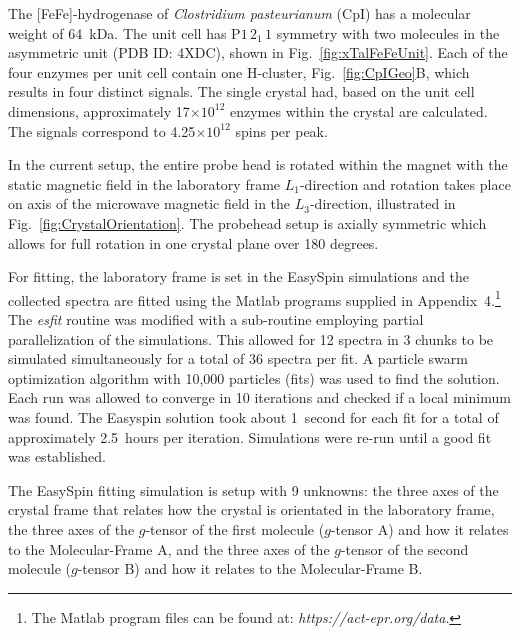 The [FeFe]-hydrogenase of {\em Clostridium pasteurianum} (CpI) has a molecular weight of 64~kDa. The unit cell has P$1\,2_1\,1$ symmetry with two molecules in the asymmetric unit (PDB ID: 4XDC), shown in Fig.~\ref{fig:xTalFeFeUnit}. Each of the four enzymes per unit cell contain one H-cluster, Fig.~\ref{fig:CpIGeo}B, which results in four distinct signals. The single crystal had, based on the unit cell dimensions, approximately 17$\times10^{12}$ enzymes within the crystal are calculated. The signals correspond to 4.25$\times10^{12}$ spins per peak. 

In the current setup, the entire probe head is rotated within the magnet with the static magnetic field in the laboratory frame $L_1$-direction and rotation takes place on axis of the microwave magnetic field in the $L_3$-direction, illustrated in Fig.~\ref{fig:CrystalOrientation}. The probehead setup is axially symmetric which allows for full rotation in one crystal plane over 180 degrees. 

For fitting, the laboratory frame is set in the EasySpin simulations and the collected spectra are fitted using the Matlab programs supplied in Appendix~4.\footnote{The Matlab program files can be found at: \textit{https://act-epr.org/data}.} The \textit{esfit} routine was modified with a sub-routine employing partial parallelization of the simulations. This allowed for 12 spectra in 3 chunks to be simulated simultaneously for a total of 36 spectra per fit. A particle swarm optimization algorithm with 10,000 particles (fits) was used to find the solution. Each run was allowed to converge in 10 iterations and checked if a local minimum was found. The Easyspin solution took about 1~second for each fit for a total of approximately 2.5~hours per iteration. Simulations were re-run until a good fit was established.

The EasySpin fitting simulation is setup with 9 unknowns: the three axes of the crystal frame that relates how the crystal is orientated in the laboratory frame, the three axes of the $g$-tensor of the first molecule ($g$-tensor A) and how it relates to the Molecular-Frame A, and the three axes of the $g$-tensor of the second molecule ($g$-tensor B) and how it relates to the Molecular-Frame B. 

